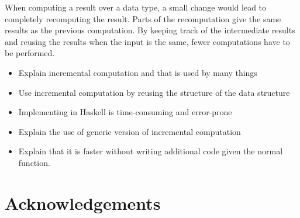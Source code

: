 
When computing a result over a data type, a small change would lead to completely recomputing the result. Parts of the recomputation give the same results as the previous computation. By keeping track of the intermediate results and reusing the results when the input is the same, fewer computations have to be performed. 

\begin{itemize}
  \item Explain incremental computation and that is used by many things
  \item Use incremental computation by reusing the structure of the data structure
  \item Implementing in Haskell is time-consuming and error-prone
  \item Explain the use of generic version of incremental computation
  \item Explain that it is faster without writing additional code given the normal function.
\end{itemize}

\section*{Acknowledgements}

